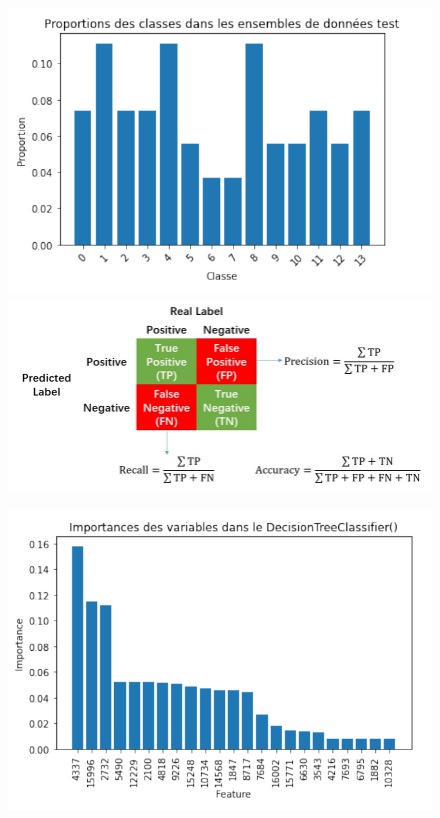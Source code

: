 \documentclass{beamer}
\theoremstyle{definition}
\begin{document}
\begin{frame}
	\begin{minipage}[t]{1\linewidth}
		\begin{minipage}[t]{0.49\linewidth}\centering\begin{figure}
				\centering
				\includegraphics[width=1\linewidth]{8.png}
				\includegraphics[width=1\linewidth]{7.png}
		\end{figure}\end{minipage}\hfill 
		\begin{minipage}[t]{0.49\linewidth}\centering\begin{figure}
				\begin{center}
					\centering
					\includegraphics[width=1\linewidth]{10.png}

\end{center}
\end{figure}
\end{minipage}
\end{minipage}
\end{frame}
\end{document}

